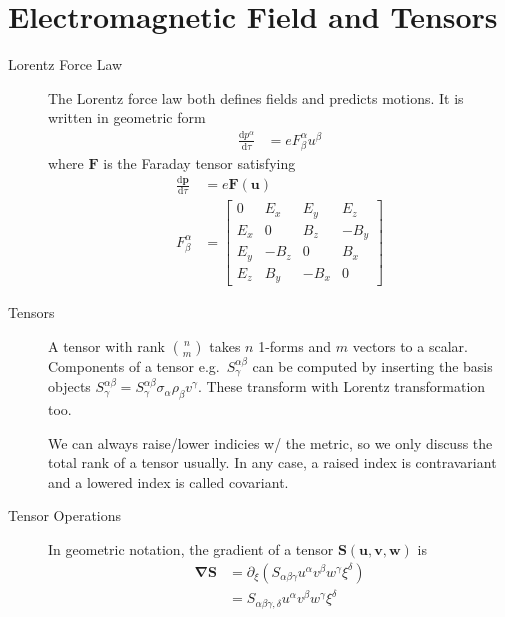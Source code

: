 \documentclass[12pt]{report}
\newcommand{\rd}[2]{\frac{\mathrm{d}#1}{\mathrm{d}#2}}
\begin{document}
\section{Electromagnetic Field and Tensors}

\begin{description}
    \item[Lorentz Force Law] The Lorentz force law both defines fields and
        predicts motions. It is written in geometric form
        \begin{align}
            \rd{p^\alpha}{\tau} &= eF^\alpha_\beta u^\beta
        \end{align}
        where $\mathbf{F}$ is the Faraday tensor satisfying
        \begin{align}
            \rd{\mathbf{p}}{\tau} &= e\mathbf{F}(\mathbf{u})\\
            F^\alpha_\beta &= \begin{bmatrix}
            0 & E_x & E_y & E_z\\
            E_x & 0 & B_z & -B_y\\
            E_y & -B_z & 0 & B_x\\
            E_z & B_y & -B_x & 0
            \end{bmatrix}
        \end{align}

    \item[Tensors] A tensor with rank $\binom{n}{m}$ takes $n$ 1-forms and $m$
        vectors to a scalar. Components of a tensor e.g.\
        $S^{\alpha\beta}_\gamma$ can be computed by inserting the basis objects
        $S^{\alpha\beta}_\gamma = S^{\alpha\beta}_\gamma \sigma_\alpha
        \rho_\beta v^\gamma$. These transform with Lorentz transformation too.

        We can always raise/lower indicies w/ the metric, so we only discuss the
        total rank of a tensor usually. In any case, a raised index is
        contravariant and a lowered index is called covariant.

    \item[Tensor Operations] In geometric notation, the gradient of a tensor
        $\mathbf{S}(\mathbf{u}, \mathbf{v}, \mathbf{w})$ is
        \begin{align}
            \mathbf{\nabla}\mathbf{S} &= \partial_\xi \left(
            S_{\alpha\beta\gamma} u^\alpha v^\beta w^\gamma \xi^\delta \right)
            \nonumber\\
            &= S_{\alpha\beta\gamma, \delta}u^\alpha v^\beta w^\gamma\xi^\delta
        \end{align}


\end{description}
\end{document}
